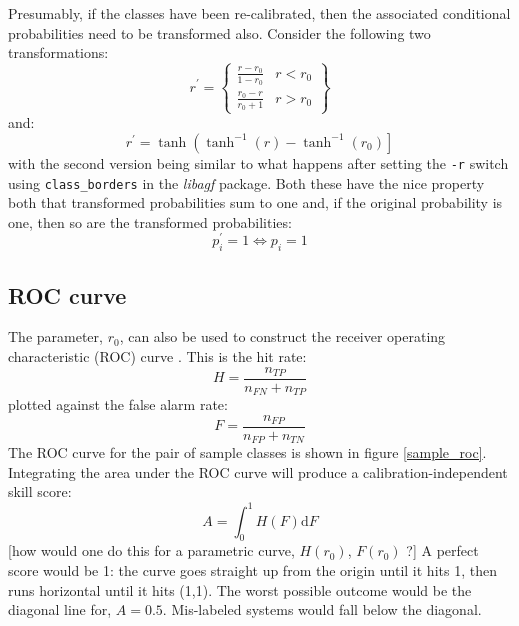 \documentclass{article}
\begin{document}
Presumably, if the classes have been re-calibrated, then the associated 
conditional probabilities need to be transformed also.
Consider the following two transformations:
\begin{equation}
r^\prime = \left \lbrace
\begin{array}{lr}
\frac{r-r_0}{1-r_0} & r<r_0 \\
\frac{r_0-r}{r_0+1} & r>r_0
\end{array} \right \rbrace
\end{equation}
and:
\begin{equation}
r^\prime=\tanh \left (\tanh^{-1}(r)-\tanh^{-1}(r_0) \right ]
\end{equation}
with the second version being similar to what happens after setting the 
\verb/-r/ switch using \verb/class_borders/ in the {\it libagf} package.
Both these have the nice property both that transformed probabilities sum
to one and, if the original probability is one, then so are the transformed
probabilities:
\begin{equation}
p_i^\prime=1 \iff p_i=1
\label{ptop}
\end{equation}

\subsection{ROC curve}

The parameter, $r_0$, can also be used to construct 
the receiver operating characteristic (ROC) curve \citep{Jolliffe_Stephenson2003}.
This is the hit rate:
\begin{equation}
	H = \frac{n_{TP}}{n_{FN} + n_{TP}}
\end{equation}
plotted against the false alarm rate:
\begin{equation}
	F = \frac{n_{FP}}{n_{FP} + n_{TN}}
\end{equation}
The ROC curve for the pair of sample classes is shown in figure
\ref{sample_roc}.
Integrating the area under the ROC curve will produce a calibration-independent
skill score:
\begin{equation}
	A = \int_0^1 H(F) \mathrm d F
\end{equation}
[how would one do this for a parametric curve, $H(r_0)$, $F(r_0)$ ?]
A perfect score would be 1: the curve goes straight up from the origin
until it hits 1, then runs horizontal until it hits (1,1).
The worst possible outcome would be the diagonal line for, $A=0.5$.
Mis-labeled systems would fall below the diagonal.
\end{document}
